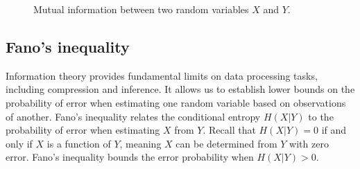 \begin{figure}[h!]
    \centering
    \caption{Mutual information between two random variables $X$ and $Y$.\label{fig:mutual_information}}
\end{figure}

\subsection{Fano's inequality}

Information theory provides fundamental limits on data processing tasks, including compression and inference. It allows us to establish lower bounds on the probability of error when estimating one random variable based on observations of another. Fano's inequality relates the conditional entropy $H(X|Y)$ to the probability of error when estimating $X$ from $Y$. Recall that $H(X|Y) = 0$ if and only if $X$ is a function of $Y$, meaning $X$ can be determined from $Y$ with zero error. Fano's inequality bounds the error probability when $H(X|Y) > 0$.

